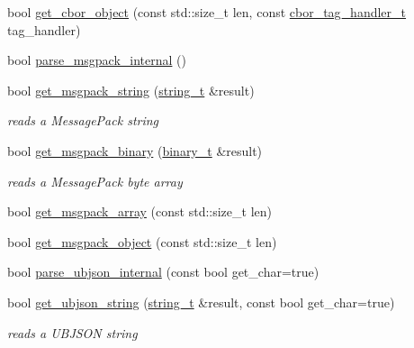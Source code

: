 \begin{DoxyCompactItemize}
\item 
bool \hyperlink{classnlohmann_1_1detail_1_1binary__reader_a47092a2195bf9cd3cdb4dda67cc404ed}{get\+\_\+cbor\+\_\+object} (const std\+::size\+\_\+t len, const \hyperlink{namespacenlohmann_1_1detail_a58bb1ef1a9ad287a9cfaf1855784d9ac}{cbor\+\_\+tag\+\_\+handler\+\_\+t} tag\+\_\+handler)
\item 
bool \hyperlink{classnlohmann_1_1detail_1_1binary__reader_ae020385ce9424271d61f85d3842c02cb}{parse\+\_\+msgpack\+\_\+internal} ()
\item 
bool \hyperlink{classnlohmann_1_1detail_1_1binary__reader_ad8cba5585327caa550dd5b6dd25a64f8}{get\+\_\+msgpack\+\_\+string} (\hyperlink{classnlohmann_1_1detail_1_1binary__reader_a823c244e5dbf1a8edae40819f9434237}{string\+\_\+t} \&result)
\begin{DoxyCompactList}\small\item\em reads a Message\+Pack string \end{DoxyCompactList}\item 
bool \hyperlink{classnlohmann_1_1detail_1_1binary__reader_a389e550fd397a48121cb82d92bb7475a}{get\+\_\+msgpack\+\_\+binary} (\hyperlink{classnlohmann_1_1detail_1_1binary__reader_acf127bb88e4147fb692edabc2a0f0663}{binary\+\_\+t} \&result)
\begin{DoxyCompactList}\small\item\em reads a Message\+Pack byte array \end{DoxyCompactList}\item 
bool \hyperlink{classnlohmann_1_1detail_1_1binary__reader_a0ce1d7066597952efb008aaf578b2bd6}{get\+\_\+msgpack\+\_\+array} (const std\+::size\+\_\+t len)
\item 
bool \hyperlink{classnlohmann_1_1detail_1_1binary__reader_a8bebd21ceef09b6b2562e87861832700}{get\+\_\+msgpack\+\_\+object} (const std\+::size\+\_\+t len)
\item 
bool \hyperlink{classnlohmann_1_1detail_1_1binary__reader_a5a79480d661019b0f3fc615ae12f7de7}{parse\+\_\+ubjson\+\_\+internal} (const bool get\+\_\+char=true)
\item 
bool \hyperlink{classnlohmann_1_1detail_1_1binary__reader_a4ae90db51c102e912b7eac83c78733a6}{get\+\_\+ubjson\+\_\+string} (\hyperlink{classnlohmann_1_1detail_1_1binary__reader_a823c244e5dbf1a8edae40819f9434237}{string\+\_\+t} \&result, const bool get\+\_\+char=true)
\begin{DoxyCompactList}\small\item\em reads a U\+B\+J\+S\+ON string \end{DoxyCompactList}\item 

\end{DoxyCompactItemize}
